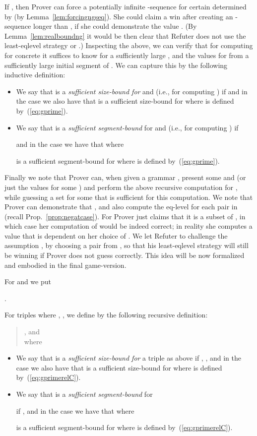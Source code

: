 \documentclass{llncs}
\begin{document}
If , then
Prover can force a potentially infinite 
-sequence for certain  determined by 
(by Lemma~\ref{lem:forcingngseq}). 
She could claim a win
after creating an -sequence longer than ,
if she could demonstrate the value .
(By Lemma~\ref{lem:realboundng} it would be then clear that Refuter does not use the least-eqlevel
strategy or .)
Inspecting the above, we can verify that for computing  
 for concrete  it suffices to know 
 for a sufficiently large ,
and the values  for  from a 
sufficiently large initial segment  of .
We can capture this by the following inductive definition:
\begin{itemize}
	\item		
We say that  is
a \emph{sufficient size-bound for}  and
 (i.e., for computing )
if  and in the case  we also have that 
 is a sufficient size-bound for  where
 is defined by~(\ref{eq:gprime}).
\item
We say that  is
a \emph{sufficient segment-bound} for  and
 (i.e., for computing )
if

and in the case  we have that
 where 
 
is a sufficient segment-bound for  where
 is defined by~(\ref{eq:gprime}).
\end{itemize}
Finally we note that Prover can, when given a grammar ,
present some  and  
(or just the values  for some
) and perform
 the above recursive computation for , while 
 guessing a set 
  for some 
 that is sufficient for this computation. We note that Prover can
 demonstrate that , and also compute the
 eq-level for each pair in  (recall
 Prop.~\ref{prop:negatcase}). 
 For  
 Prover just claims that 
it is a subset of , in which case her computation of
 would be indeed correct; in reality she computes
a value  that is dependent on her choice of
.
We let Refuter to challenge 
the assumption , 
by choosing a pair from ,
so that his least-eqlevel
strategy will still be winning if Prover does not guess  
correctly.
This idea will be
now formalized and embodied in the final game-version.

For  and  we put
\begin{center}
.
\end{center}
For triples  where
, , 
we define 
 by the following recursive definition:
\begin{quote}
	, and
\\
 where 
\end{quote}


\begin{itemize}
	\item		
We say that 
		 is
a \emph{sufficient size-bound for}  a triple  as above
if , ,
and in the case  
 we also have that
 is a sufficient size-bound for  where
 is defined by~(\ref{eq:gprimerelC}).
\item
We say that  is
a \emph{sufficient segment-bound} for 

if
, and in the case  we have that
 where 
 
is a sufficient segment-bound for  where
 is defined by~(\ref{eq:gprimerelC}).
\end{itemize}
\end{document}
